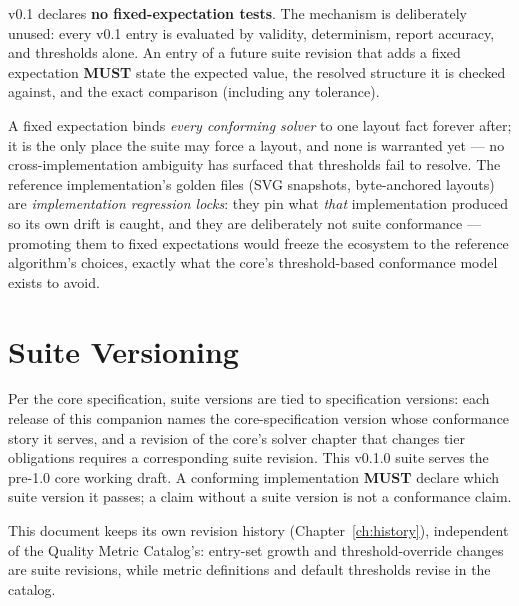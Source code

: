 \documentclass[11pt,letterpaper]{report}
\newcounter{requirement}[chapter]
\newcommand{\MUST}{\textbf{MUST}}
\begin{document}
\begin{requirement}
\label{req:refsuite:fixed-expectations}
v0.1 declares \textbf{no fixed-expectation tests}. The mechanism is
deliberately unused: every v0.1 entry is evaluated by validity,
determinism, report accuracy, and thresholds alone. An entry of a future
suite revision that adds a fixed expectation \MUST{} state the expected
value, the resolved structure it is checked against, and the exact
comparison (including any tolerance).
\end{requirement}

\begin{rationale}
A fixed expectation binds \emph{every conforming solver} to one layout
fact forever after; it is the only place the suite may force a layout,
and none is warranted yet --- no cross-implementation ambiguity has
surfaced that thresholds fail to resolve. The reference implementation's
golden files (SVG snapshots, byte-anchored layouts) are
\emph{implementation regression locks}: they pin what \emph{that}
implementation produced so its own drift is caught, and they are
deliberately not suite conformance --- promoting them to fixed
expectations would freeze the ecosystem to the reference algorithm's
choices, exactly what the core's threshold-based conformance model
exists to avoid.
\end{rationale}

\section{Suite Versioning}
\label{sec:model:versioning}

\begin{requirement}
\label{req:refsuite:versioning}
Per the core specification, suite versions are tied to specification
versions: each release of this companion names the core-specification
version whose conformance story it serves, and a revision of the core's
solver chapter that changes tier obligations requires a corresponding
suite revision. This v0.1.0 suite serves the pre-1.0 core working draft.
A conforming implementation \MUST{} declare which suite version it
passes; a claim without a suite version is not a conformance claim.
\end{requirement}

This document keeps its own revision history (Chapter~\ref{ch:history}),
independent of the Quality Metric Catalog's: entry-set growth and
threshold-override changes are suite revisions, while metric definitions
and default thresholds revise in the catalog.
\end{document}
